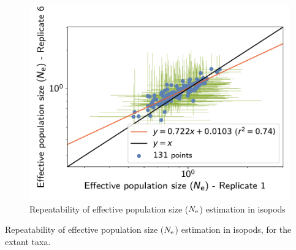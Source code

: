 \documentclass{article}
\begin{document}
\begin{figure}[H]
\begin{minipage}{0.32\linewidth}
			\includegraphics[width=\linewidth, page=1]{isopods/12CDS_SiteMutSelBranchNe_Rep-1-6_LogPopulationSize}
		\end{minipage}
		\caption[Repeatability of $\Ne$ estimation in isopods]{Repeatability of {effective population size} ($\Ne$) estimation in isopods}
	\end{figure}

	\begin{table}[htbp]
		\renewcommand{\arraystretch}{0.5}
		\scriptsize
		\noindent{}
		\caption[Repeatability of $\Ne$ estimation in isopods]{Repeatability of {effective population size} ($\Ne$) estimation in isopods, for the extant taxa.}
		\label{tab:Ne-estimated-isopods}
	\end{table}
\end{document}
